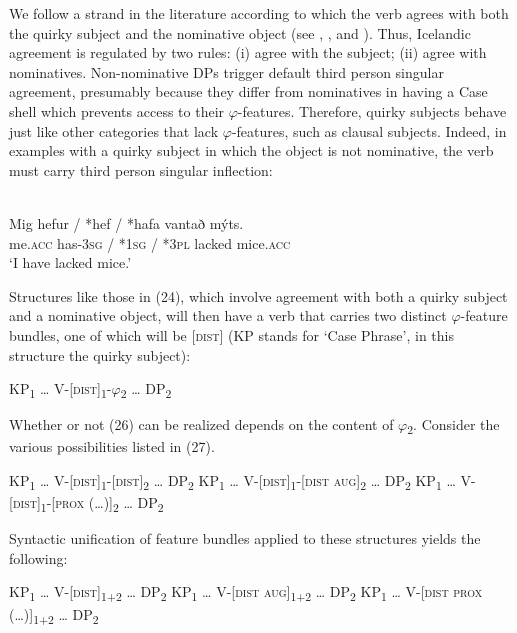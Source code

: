 \documentclass[output=paper]{langsci/langscibook}
\begin{document}
We follow a strand in the literature according to which the verb agrees with both the quirky subject and the nominative object (see \citealt{Burzio2000}, \citealt{Schütze2003}, and \citealt{Ussery2013}). Thus, Icelandic agreement is regulated by two rules: (i) agree with the subject; (ii) agree with nominatives. Non-nominative DPs trigger default third person singular agreement, presumably because they differ from nominatives in having a Case shell which prevents access to their $\varphi $-features. Therefore, quirky subjects behave just like other categories that lack $\varphi $-features, such as clausal subjects. Indeed, in examples with a quirky subject in which the object is not nominative, the verb must carry third person singular inflection:

\ea \citep{Schütze2003}\\
 \gll    Mig      hefur / *hef / *hafa     vantað mýts. \\
         me.\textsc{acc} has-\textsc{3sg} / *\textsc{1sg} / *\textsc{3pl} lacked mice.\textsc{acc}\\
 \glt    ‘I have lacked mice.’ 
\z

Structures like those in (24), which involve agreement with both a quirky subject and a nominative object, will then have a verb that carries two distinct $\varphi $-feature bundles, one of which will be [\textsc{dist}] (KP stands for ‘Case Phrase’, in this structure the quirky subject):

\ea \label{bkm:Ref295466963}  KP\textsubscript{1} … V-[\textsc{dist}]\textsubscript{1}{}-$\varphi $\textsubscript{2} … DP\textsubscript{2} \z

Whether or not (26) can be realized depends on the content of $\varphi $\textsubscript{2}. Consider the various possibilities listed in (27).

\ea \label{bkm:Ref295570245}\label{bkm:Ref295481259}  
\ea  KP\textsubscript{1} … V-[\textsc{dist}]\textsubscript{1}{}-[\textsc{dist}]\textsubscript{2} … DP\textsubscript{2}
\ex  KP\textsubscript{1} … V-[\textsc{dist}]\textsubscript{1}{}-[\textsc{dist} \textsc{aug}]\textsubscript{2} … DP\textsubscript{2}
\ex  KP\textsubscript{1} … V-[\textsc{dist}]\textsubscript{1}{}-[\textsc{prox} (…)]\textsubscript{2} … DP\textsubscript{2}
\z
\z

Syntactic unification of feature bundles applied to these structures yields the following:

\ea \label{bkm:Ref295480997}  
\ea KP\textsubscript{1} … V-[\textsc{dist}]\textsubscript{1+2} … DP\textsubscript{2}
\ex KP\textsubscript{1} … V-[\textsc{dist} \textsc{aug}]\textsubscript{1+2} … DP\textsubscript{2}
\ex KP\textsubscript{1} … V-[\textsc{dist prox} (…)]\textsubscript{1+2} … DP\textsubscript{2}
\z
\z
\end{document}
